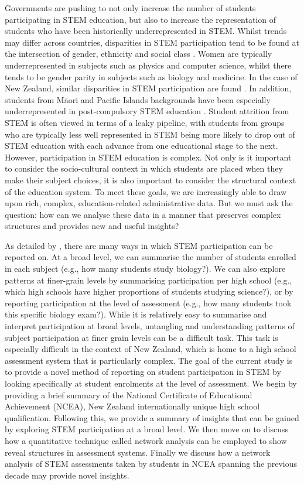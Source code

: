 Governments are pushing to not only increase the number of students participating in STEM education, but also to increase the representation of students who have been historically underrepresented in STEM. Whilst trends may differ across countries, disparities in STEM participation tend to be found at the intersection of gender, ethnicity and social class \citep{Archer2015b, PISA_NZ_2017}. Women are typically underrepresented in subjects such as physics and computer science, whilst there tends to be gender parity in subjects such as biology and medicine. In the case of New Zealand, similar disparities in STEM participation are found \citep{NZQA2016,EducationCounts_2016a,EducationCounts_2016b}. In addition, students from M\={a}ori and Pacific Islands backgrounds have been especially underrepresented in post-compulsory STEM education \citep{MoH2014, NZQA2016}. Student attrition from STEM is often viewed in terms of a leaky pipeline, with students from groups who are typically less well represented in STEM being more likely to drop out of STEM education with each advance from one educational stage to the next. However, participation in STEM education is  complex. Not only is it important to consider the socio-cultural context in which students are placed when they make their subject choices, it is also important to consider the structural context of the education system. To meet these goals, we are increasingly able to draw upon rich, complex, education-related administrative data. But we must ask the question: how can we analyse these data in a manner that preserves complex structures and provides new and useful insights?

As detailed by \citet{hipkins2005staying}, there are many ways in which STEM participation can be reported on. At a broad level, we can summarise the number of students enrolled in each subject (e.g., how many students study biology?). We can also explore patterns at finer-grain levels by summarising participation per high school (e.g., which high schools have higher proportions of students studying science?), or by reporting participation at the level of assessment (e.g., how many students took this specific biology exam?). While it is relatively easy to summarise and interpret participation at broad levels, untangling and understanding patterns of subject participation at finer grain levels can be a difficult task. This task is especially difficult in the context of New Zealand, which is home to a high school assessment system that is particularly complex. The goal of the current study is to provide a novel method of reporting on student participation in STEM by looking specifically at student enrolments at the level of assessment. We begin by providing a brief summary of the National Certificate of Educational Achievement (NCEA), New Zealand internationally unique high school qualification. Following this, we provide a summary of insights that can be gained by exploring STEM participation at a broad level. We then move on to discuss how a quantitative technique called network analysis can be employed to show reveal structures in assessment systems. Finally we discuss how a network analysis of STEM assessments taken by students in NCEA spanning the previous decade may provide novel insights. 

